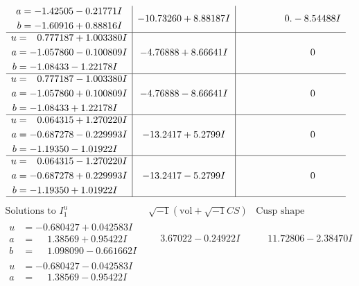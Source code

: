 \documentclass[1p]{elsarticle_modified}
\theoremstyle{definition}
\newcommand{\I}{\sqrt{-1}}
\begin{document}
$$\begin{array}{c|c|c}
\begin{aligned}
a &= -1.42505 - 0.21771 I \\
b &= -1.60916 + 0.88816 I\end{aligned}
 & -10.73260 + 8.88187 I & \phantom{-0.000000 } 0. - 8.54488 I \\ \hline\begin{aligned}
u &= \phantom{-}0.777187 + 1.003380 I \\
a &= -1.057860 - 0.100809 I \\
b &= -1.08433 - 1.22178 I\end{aligned}
 & -4.76888 + 8.66641 I & \phantom{-0.000000 } 0 \\ \hline\begin{aligned}
u &= \phantom{-}0.777187 - 1.003380 I \\
a &= -1.057860 + 0.100809 I \\
b &= -1.08433 + 1.22178 I\end{aligned}
 & -4.76888 - 8.66641 I & \phantom{-0.000000 } 0 \\ \hline\begin{aligned}
u &= \phantom{-}0.064315 + 1.270220 I \\
a &= -0.687278 - 0.229993 I \\
b &= -1.19350 - 1.01922 I\end{aligned}
 & -13.2417 + 5.2799 I & \phantom{-0.000000 } 0 \\ \hline\begin{aligned}
u &= \phantom{-}0.064315 - 1.270220 I \\
a &= -0.687278 + 0.229993 I \\
b &= -1.19350 + 1.01922 I\end{aligned}
 & -13.2417 - 5.2799 I & \phantom{-0.000000 } 0\\
 \hline 
 \end{array}$$\newpage$$\begin{array}{c|c|c}  
\text{Solutions to }I^u_{1}& \I (\text{vol} + \sqrt{-1}CS) & \text{Cusp shape}\\
 \hline 
\begin{aligned}
u &= -0.680427 + 0.042583 I \\
a &= \phantom{-}1.38569 + 0.95422 I \\
b &= \phantom{-}1.098090 - 0.661662 I\end{aligned}
 & \phantom{-}3.67022 - 0.24922 I & \phantom{-}11.72806 - 2.38470 I \\ \hline\begin{aligned}
u &= -0.680427 - 0.042583 I \\
a &= \phantom{-}1.38569 - 0.95422 I \\

\end{aligned}
\end{array}$$
\end{document}

